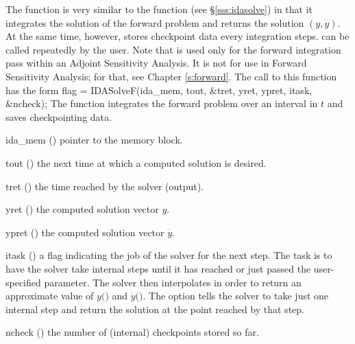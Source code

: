 The function  is very similar to the {\idas} function 
(see \S\ref{sss:idasolve}) in that it integrates the solution of the forward
problem and returns the solution $(y,\dot{y})$. At the same time, however,
 stores checkpoint data every  integration steps.
 can be called repeatedly by the user.
Note that  is used only for the forward integration pass within
an Adjoint Sensitivity Analysis.  It is not for use in Forward Sensitivity
Analysis; for that, see Chapter \ref{s:forward}.
The call to this function has the form
{
  flag = IDASolveF(ida\_mem, tout, \&tret, yret, ypret, itask, \&ncheck);
}
{
  The function  integrates the forward problem over an interval in $t$
  and saves checkpointing data.
}
{
  \begin{args}
  \item[ida\_mem] ()
    pointer to the {\idas} memory block.
  \item[tout] ()
    the next time at which a computed solution is desired.
  \item[tret] ()
    the time reached by the solver (output).
  \item[yret] ()
    the computed solution vector $y$.
  \item[ypret] ()
    the computed solution vector $\dot{y}$.
  \item[itask] ()
    a flag indicating the job of the solver for the next step.
    The  task is to have the solver take internal steps until
    it has reached or just passed the user-specified 
    parameter. The solver then interpolates in order to
    return an approximate value of $y($$)$ and $\dot{y}($$)$.
    The  option tells the solver to take just one internal step
    and return the solution at the point reached by that step.
  \item[ncheck] ()
    the number of (internal) checkpoints stored so far.
  \end{args}
}
